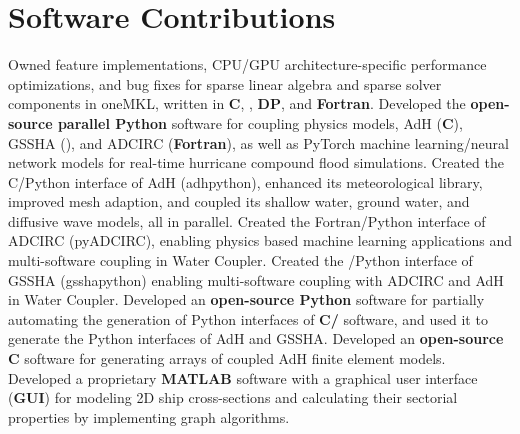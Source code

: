 \documentclass[letterpaper,10pt]{article}
\begin{document}
\section{Software Contributions}
  \resumeSubItemListStart
      {Owned feature implementations, CPU/GPU architecture-specific performance
       optimizations, and bug fixes for sparse linear algebra and sparse solver
       components in oneMKL, written in \textbf{C}, \textbf{\CC{}},
       \textbf{DP\CC{}}, and \textbf{Fortran}.}
      {Developed the \textbf{open-source parallel Python} software for coupling
      physics models, AdH (\textbf{C}), GSSHA (\textbf{\CC{}}), and ADCIRC
      (\textbf{Fortran}), as well as PyTorch machine learning/neural network
      models for real-time hurricane compound flood simulations.}
      {Created the C/Python interface of AdH (adhpython), enhanced its meteorological library,
      improved mesh adaption, and coupled its shallow water, ground
      water, and diffusive wave models, all in parallel.}
      {Created the Fortran/Python interface of ADCIRC (pyADCIRC), enabling physics
      based machine learning applications and multi-software coupling in Water
      Coupler.}
      {Created the \CC{}/Python interface of GSSHA (gsshapython) enabling
      multi-software coupling with ADCIRC and AdH in Water Coupler.}
      {Developed an \textbf{open-source Python} software for partially
      automating the generation of Python interfaces of \textbf{C/\CC{}}
      software, and used it to generate the Python interfaces of AdH and GSSHA.}
      {Developed an \textbf{open-source C} software for generating arrays of
      coupled AdH finite element models.}
      {Developed a proprietary \textbf{MATLAB} software with a graphical user
      interface (\textbf{GUI}) for modeling 2D ship cross-sections and
      calculating their sectorial properties by implementing graph algorithms.}
  \resumeSubItemListEnd
\vspace{-5pt}
\end{document}
